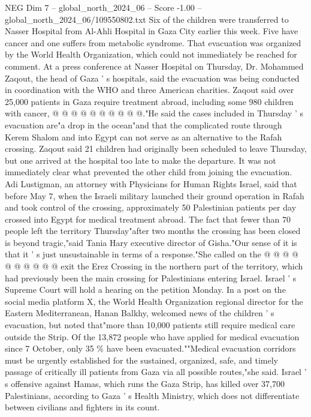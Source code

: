 \begin{textsample}{NEG Dim 7 – global\_north\_2024\_06 – Score -1.00 – global\_north\_2024\_06/109550802.txt}
Six of the children were transferred to Nasser Hospital from Al-Ahli Hospital in Gaza City earlier this week.
Five have cancer and one suffers from metabolic syndrome.
That evacuation was organized by the World Health Organization, which could not immediately be reached for comment.
At a press conference at Nasser Hospital on Thursday, Dr.
Mohammed Zaqout, the head of Gaza ' s hospitals, said the evacuation was being conducted in coordination with the WHO and three American charities.
Zaqout said over 25,000 patients in Gaza require treatment abroad, including some 980 children with cancer, @ @ @ @ @ @ @ @ @ @."He said the cases included in Thursday ' s evacuation are"a drop in the ocean"and that the complicated route through Kerem Shalom and into Egypt can not serve as an alternative to the Rafah crossing.
Zaqout said 21 children had originally been scheduled to leave Thursday, but one arrived at the hospital too late to make the departure.
It was not immediately clear what prevented the other child from joining the evacuation.
Adi Lustigman, an attorney with Physicians for Human Rights Israel, said that before May 7, when the Israeli military launched their ground operation in Rafah and took control of the crossing, approximately 50 Palestinian patients per day crossed into Egypt for medical treatment abroad.
The fact that fewer than 70 people left the territory Thursday"after two months the crossing has been closed is beyond tragic,"said Tania Hary executive director of Gisha."Our sense of it is that it ' s just unsustainable in terms of a response."She called on the @ @ @ @ @ @ @ @ @ @ exit the Erez Crossing in the northern part of the territory, which had previously been the main crossing for Palestinians entering Israel.
Israel ' s Supreme Court will hold a hearing on the petition Monday.
In a post on the social media platform X, the World Health Organization regional director for the Eastern Mediterranean, Hanan Balkhy, welcomed news of the children ' s evacuation, but noted that"more than 10,000 patients still require medical care outside the Strip.
Of the 13,872 people who have applied for medical evacuation since 7 October, only 35 \% have been evacuated.""Medical evacuation corridors must be urgently established for the sustained, organized, safe, and timely passage of critically ill patients from Gaza via all possible routes,"she said.
Israel ' s offensive against Hamas, which runs the Gaza Strip, has killed over 37,700 Palestinians, according to Gaza ' s Health Ministry, which does not differentiate between civilians and fighters in its count.

\end{textsample}
